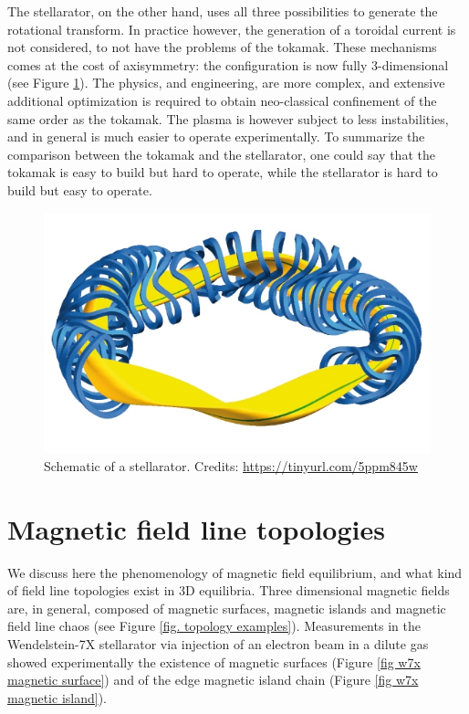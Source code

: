 \documentclass[my_thesis.tex]{subfiles}
\begin{document}
The stellarator, on the other hand, uses all three possibilities to generate the rotational transform. In practice however, the generation of a toroidal current is not considered, to not have the problems of the tokamak. These mechanisms comes at the cost of axisymmetry: the configuration is now fully 3-dimensional (see Figure \ref{fig stellarator sketch}). The physics, and engineering, are more complex, and extensive additional optimization is required to obtain neo-classical confinement of the same order as the tokamak. The plasma is however subject to less instabilities, and in general is much easier to operate experimentally. To summarize the comparison between the tokamak and the stellarator, one could say that the tokamak is easy to build but hard to operate, while the stellarator is hard to build but easy to operate.

\begin{figure}
    \centering
    \includegraphics[width=\linewidth]{images/introduction/StellaratorSketch.jpg}
    \caption{Schematic of a stellarator. Credits: \url{https://tinyurl.com/5ppm845w}}
    \label{fig stellarator sketch}
\end{figure}




\section{Magnetic field line topologies}

We discuss here the phenomenology of magnetic field equilibrium, and what kind of field line topologies exist in 3D equilibria. Three dimensional magnetic fields are, in general, composed of  magnetic surfaces, magnetic islands and magnetic field line chaos (see Figure \ref{fig. topology examples}). Measurements in the Wendelstein-7X stellarator via injection of an electron beam in a dilute gas \citep{pedersenConfirmationTopologyWendelstein2016} showed experimentally the existence of magnetic surfaces (Figure \ref{fig w7x magnetic surface}) and of the edge magnetic island chain (Figure \ref{fig w7x magnetic island}).
\end{document}
